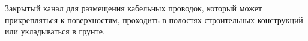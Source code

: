 Закрытый канал для размещения кабельных проводок, который 
может прикрепляться к поверхностям, проходить в 
полостях строительных конструкций или укладываться в грунте.